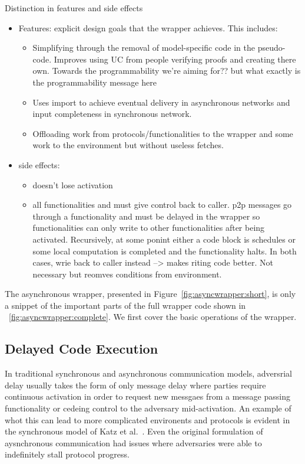 Distinction in features and side effects
\begin{itemize}
\item Features: explicit design goals that the wrapper achieves. This includes:
	\begin{itemize}
	\item Simplifying through the removal of model-specific code in the pseudo-code. Improves using UC from people verifying proofs and creating there own. Towards the programmability we're aiming for?? but what exactly is the programmability message here
	\item Uses import to achieve eventual delivery in asynchronous networks and input completeness in synchronous network.
	\item Offloading work from protocols/functionalities to the wrapper and some work to the environment but without useless fetches.
	\end{itemize}

\item side effects:
	\begin{itemize}
	\item doesn't lose activation
	\item all functionalities and must give control back to caller. p2p messages go through a functionality and must be delayed in the wrapper so functionalities can only write to other functionalities after being activated. Recursively, at some ponint either a code block is schedules or some local computation is completed and the functionality halts. In both cases, wrie back to caller instead --> makes riting code better. Not necessary but reomves conditions from environment.
	\end{itemize}
\end{itemize}



The asynchronous wrapper, presented in Figure~\ref{fig:asyncwrapper:short}, is only a snippet of the important parts of the full wrapper code shown in ~\ref{fig:asyncwrapper:complete}.
We first cover the basic operations of the wrapper.


\subsection{Delayed Code Execution}
In traditional synchronous and asynchronous communication models, adversrial delay usually takes the form of only message delay where parties require continuous activation in order to request new messgaes from a message passing functionality or cedeing control to the adversary mid-activation.
An example of whot this can lead to more complicated environents and protocols is evident in the synchronous model of Katz et al.~\cite{katzclock}. 
Even the original formulation of aysnchronous communication had issues where adversaries were able to indefinitely stall protocol progress.

